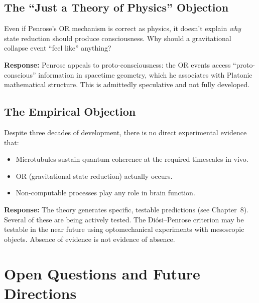\documentclass[11pt,a4paper]{report}
\begin{document}
\section{The ``Just a Theory of Physics'' Objection}

\begin{objbox}
Even if Penrose's OR mechanism is correct as physics, it doesn't explain \emph{why} state reduction should produce consciousness. Why should a gravitational collapse event ``feel like'' anything?
\end{objbox}

\textbf{Response:} Penrose appeals to proto-consciousness: the OR events access ``proto-conscious'' information in spacetime geometry, which he associates with Platonic mathematical structure. This is admittedly speculative and not fully developed.

\section{The Empirical Objection}

\begin{objbox}
Despite three decades of development, there is no direct experimental evidence that:
\begin{itemize}[leftmargin=1.5em]
  \item Microtubules sustain quantum coherence at the required timescales in vivo.
  \item OR (gravitational state reduction) actually occurs.
  \item Non-computable processes play any role in brain function.
\end{itemize}
\end{objbox}

\textbf{Response:} The theory generates specific, testable predictions (see Chapter~8). Several of these are being actively tested. The Di\'osi--Penrose criterion may be testable in the near future using optomechanical experiments with mesoscopic objects. Absence of evidence is not evidence of absence.


\chapter{Open Questions and Future Directions}
\end{document}
